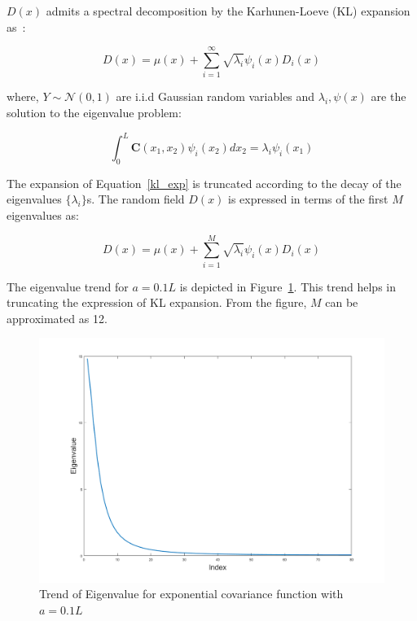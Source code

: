 $D(x)$ admits a spectral decomposition by the Karhunen-Loeve (KL) expansion as~\cite{ghanem2003stochastic}:

\begin{equation}
\label{kl_exp}
D(x)  = \mu(x) + \sum_{i=1}^\infty \sqrt{\lambda_i}\psi_i(x)D_i(x)
\end{equation}

\noindent where, $Y \sim \mathcal{N}(0,1)$ are i.i.d Gaussian random variables and $\lambda_i, \psi(x)$ are the solution to the eigenvalue problem:

\begin{equation}
\int_0^L \textbf{C}(x_1,x_2) \psi_i(x_2) dx_2 = \lambda_i \psi_i(x_1)
\end{equation}

The expansion of Equation~\ref{kl_exp} is truncated according to the decay of the eigenvalues $\lbrace \lambda_i \rbrace$s. The random field $D(x)$ is expressed in terms of the first $M$ eigenvalues as:

\begin{equation}
D(x)  = \mu(x) + \sum_{i=1}^M \sqrt{\lambda_i}\psi_i(x)D_i(x)
\end{equation} 

The eigenvalue trend for $a = 0.1L$ is depicted in Figure~\ref{eigenvalue}. This trend helps in truncating the expression of KL expansion. From the figure, $M$ can be approximated as 12. 


\begin{figure}[H]
\centering
\includegraphics[scale=0.4]{figures_2/eigenvalue}
\caption{Trend of Eigenvalue for exponential covariance function with $a = 0.1L$}
\label{eigenvalue}
\end{figure}


